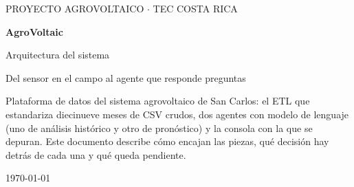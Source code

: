 \documentclass[11pt,a4paper]{article}
\begin{document}
\begin{titlepage}
\centering
\vspace*{3.5cm}
{\color{humo}\large PROYECTO AGROVOLTAICO $\cdot$ TEC COSTA RICA\par}
\vspace{1.2cm}
{\Huge\bfseries\color{agua} AgroVoltaic\par}
\vspace{0.4cm}
{\LARGE Arquitectura del sistema\par}
\vspace{1.2cm}
{\large\color{tinta} Del sensor en el campo al agente que responde preguntas\par}
\vfill
\begin{minipage}{0.82\textwidth}
\small\color{tinta}
Plataforma de datos del sistema agrovoltaico de San Carlos: el ETL que estandariza
diecinueve meses de CSV crudos, dos agentes con modelo de lenguaje (uno de análisis
histórico y otro de pronóstico) y la consola con la que se depuran. Este documento
describe cómo encajan las piezas, qué decisión hay detrás de cada una y qué queda
pendiente.
\end{minipage}
\vfill
{\color{humo} \today\par}
\end{titlepage}

\tableofcontents
\newpage










\end{document}
